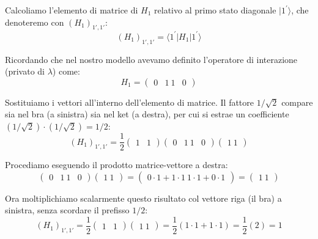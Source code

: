 Calcoliamo l'elemento di matrice di $H_1$ relativo al primo stato diagonale $\vert{}1^{\prime}\rangle$, che denoteremo con $(H_1)_{1',1'}$:
\begin{equation}
(H_1)_{1',1'} = \langle 1^{\prime} | H_1 | 1^{\prime} \rangle
\end{equation}

Ricordando che nel nostro modello avevamo definito l'operatore di interazione (privato di $\lambda$) come:
\begin{equation}
H_1 = \begin{pmatrix} 0 & 1 \ 1 & 0 \end{pmatrix}
\end{equation}

Sostituiamo i vettori all'interno dell'elemento di matrice. Il fattore $1/\sqrt{2}$ compare sia nel bra (a sinistra) sia nel ket (a destra), per cui si estrae un coefficiente $(1/\sqrt{2}) \cdot (1/\sqrt{2}) = 1/2$:
\begin{equation}
(H_1)_{1',1'} = \frac{1}{2} \begin{pmatrix} 1 & 1 \end{pmatrix} \begin{pmatrix} 0 & 1 \ 1 & 0 \end{pmatrix} \begin{pmatrix} 1 \ 1 \end{pmatrix}
\end{equation}

Procediamo eseguendo il prodotto matrice-vettore a destra:
\begin{equation}
\begin{pmatrix} 0 & 1 \ 1 & 0 \end{pmatrix} \begin{pmatrix} 1 \ 1 \end{pmatrix} = \begin{pmatrix} 0\cdot 1 + 1\cdot 1 \ 1\cdot 1 + 0\cdot 1 \end{pmatrix} = \begin{pmatrix} 1 \ 1 \end{pmatrix}
\end{equation}

Ora moltiplichiamo scalarmente questo risultato col vettore riga (il bra) a sinistra, senza scordare il prefisso $1/2$:
\begin{equation}
(H_1)_{1',1'} = \frac{1}{2} \begin{pmatrix} 1 & 1 \end{pmatrix} \begin{pmatrix} 1 \ 1 \end{pmatrix} = \frac{1}{2} (1 \cdot 1 + 1 \cdot 1) = \frac{1}{2} (2) = 1
\end{equation}

